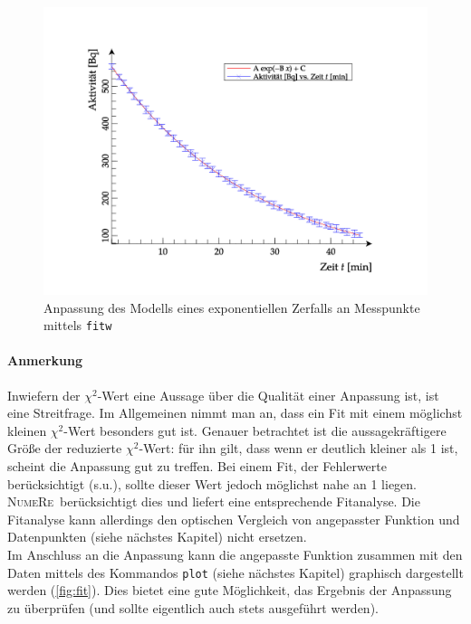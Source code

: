 \documentclass[DIV=14,headsepline,footsepline]{scrbook}
\newcommand{\NR}{\textsc{Nu\-me\-Re}}
\begin{document}
				\begin{figure}[htb]%
					\centering
					\includegraphics[width=\textwidth]{_graphics/plot.png}
					\caption{Anpassung des Modells eines exponentiellen Zerfalls an Messpunkte mittels \texttt{fitw}}
					\label{fig:fit}
				\end{figure}
				
				\paragraph{Anmerkung}
					Inwiefern der $\chi^2$-Wert eine Aussage über die Qualität einer Anpassung ist, ist eine Streitfrage. Im Allgemeinen nimmt man an, dass ein Fit mit einem möglichst kleinen $\chi^2$-Wert besonders gut ist. Genauer betrachtet ist die aussagekräftigere Größe der reduzierte $\chi^2$-Wert: für ihn gilt, dass wenn er deutlich kleiner als 1 ist, scheint die Anpassung gut zu treffen. Bei einem Fit, der Fehlerwerte berücksichtigt (s.u.), sollte dieser Wert jedoch möglichst nahe an 1 liegen. \NR\ berücksichtigt dies und liefert eine entsprechende Fitanalyse. Die Fitanalyse kann allerdings den optischen Vergleich von angepasster Funktion und Datenpunkten (siehe nächstes Kapitel) nicht ersetzen.\bigskip\\
				Im Anschluss an die Anpassung kann die angepasste Funktion zusammen mit den Daten mittels des Kommandos \verb+plot+ (siehe nächstes Kapitel) graphisch dargestellt werden (\autoref{fig:fit}). Dies bietet eine gute Möglichkeit, das Ergebnis der Anpassung zu überprüfen (und sollte eigentlich auch stets ausgeführt werden).
				
\end{document}
